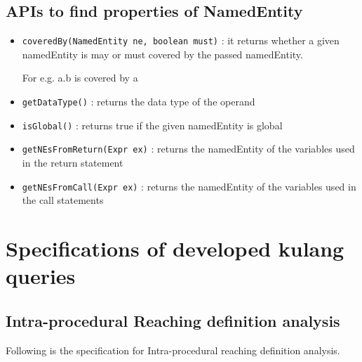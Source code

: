 \documentclass[11pt,a4paper,openright]{report}
\begin{document}
\section{APIs to find properties of NamedEntity}
\begin{itemize}
 \item \texttt{coveredBy(NamedEntity ne, boolean must)} : it returns whether a given namedEntity is may or must covered by the passed namedEntity.
 
 For e.g. a.b is covered by a
 \item \texttt{getDataType()} : returns the data type of the operand

 \item \texttt{isGlobal()} : returns true if the given namedEntity is global
 \item \texttt{getNEsFromReturn(Expr ex)} : returns the namedEntity of the variables used in the return statement
 \item \texttt{getNEsFromCall(Expr ex)} : returns the namedEntity of the variables used in the call statements
\end{itemize}


\chapter{Specifications of developed kulang queries}\label{ap:C}
\section{Intra-procedural Reaching definition analysis}
Following is the specification for Intra-procedural reaching definition analysis.
\end{document}

